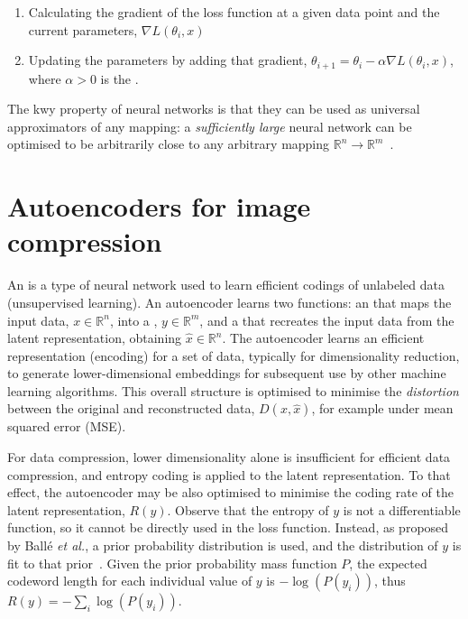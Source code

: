 \begin{enumerate}
	\item Calculating the gradient of the loss function at a given data point and the current parameters, $\nabla L(\theta_i, x)$
	\item Updating the parameters by adding that gradient, $\theta_{i+1} = \theta_i -\alpha \nabla L(\theta_i, x)$, where $\alpha>0$ is the .
\end{enumerate}

The kwy property of neural networks is that they can be used as universal approximators of any mapping: a \textit{sufficiently large} neural network can be optimised to be arbitrarily close to any arbitrary mapping $\mathbb{R}^n \rightarrow \mathbb{R}^m$~\cite{hornik1991approximation, kidger2020universal}.


\section{Autoencoders for image compression}

An  is a type of neural network used to learn efficient codings of unlabeled data (unsupervised learning). An autoencoder learns two functions: an  that maps the input data, $x\in \mathbb{R}^n$, into a , $y\in \mathbb{R}^m$, and a  that recreates the input data from the latent representation, obtaining $\hat{x}\in \mathbb{R}^n$. The autoencoder learns an efficient representation (encoding) for a set of data, typically for dimensionality reduction, to generate lower-dimensional embeddings for subsequent use by other machine learning algorithms. This overall structure is optimised to minimise the \textit{distortion} between the original and reconstructed data, $D(x, \hat{x})$, for example under mean squared error (MSE).

For data compression, lower dimensionality alone is insufficient for efficient data compression, and entropy coding is applied to the latent representation. To that effect, the autoencoder may be also optimised to minimise the coding rate of the latent representation, $R(y)$. Observe that the entropy of $y$ is not a differentiable function, so it cannot be directly used in the loss function. Instead, as proposed by Ballé \textit{et al.}, a prior probability distribution is used, and the distribution of $y$ is fit to that prior~\cite{BalleLaparra2017factorised, Balle2021NTC}. Given the prior probability mass function $P$, the expected codeword length for each individual value of $y$ is $-\log(P(y_i))$, thus $R(y) = - \sum_i \log(P(y_i))$.

